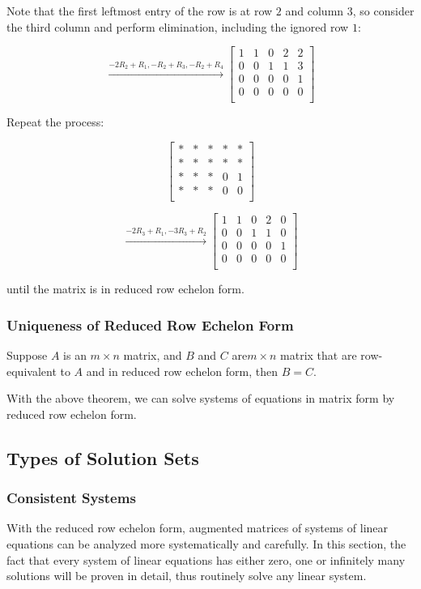 \documentclass[a4paper,12pt]{article}
\begin{document}
\begin{exm}
  Note that the first leftmost entry of the row is at row $2$ and column $3$, so consider the third column and perform elimination, including the ignored row $1$:

  $$\xrightarrow[ ]{-2R_{2}+R_{1},-R_{2}+R_{3},-R_{2}+R_{4}}\begin{bmatrix}
  1 & 1 & 0 & 2 & 2\\
  0 & 0 & 1 & 1 & 3\\
  0 & 0 & 0 & 0 & 1\\
  0 & 0 & 0 & 0 & 0\\
  \end{bmatrix}$$\s

  Repeat the process:

  $$\begin{bmatrix}
  * & * & * & * & *\\
  * & * & * & * & *\\
  * & * & * & 0 & 1\\
  * & * & * & 0 & 0\\
  \end{bmatrix}$$\s

  $$\xrightarrow[ ]{-2R_{3}+R_{1},-3R_{3}+R_{2}}\begin{bmatrix}
  1 & 1 & 0 & 2 & 0\\
  0 & 0 & 1 & 1 & 0\\
  0 & 0 & 0 & 0 & 1\\
  0 & 0 & 0 & 0 & 0\\
  \end{bmatrix}$$\s

  until the matrix is in reduced row echelon form.
\end{exm}

\subsubsection{Uniqueness of Reduced Row Echelon Form}
\begin{thm}
  Suppose $A$ is an $m\times n$ matrix, and $B$ and $C$ are$m\times n$ matrix that are row-equivalent to $A$ and in reduced row echelon form, then $B=C$.
\end{thm}\n

With the above theorem, we can solve systems of equations in matrix form by reduced row echelon form.

\subsection{Types of Solution Sets}
\subsubsection{Consistent Systems}
With the reduced row echelon form, augmented matrices of systems of linear equations can be analyzed more systematically and carefully. In this section, the fact that every system of linear equations has either zero, one or infinitely many solutions will be proven in detail, thus routinely solve any linear system.\n
\end{document}
